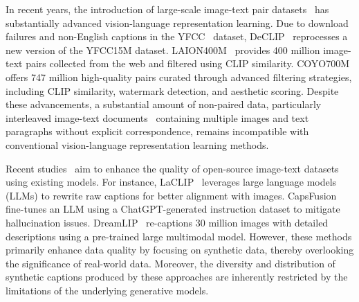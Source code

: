 In recent years, the introduction of large-scale image-text pair datasets~\cite{laion400M, laion5B, YFCC100M, kakaobrain2022coyo700m, Datacomp} has substantially advanced vision-language representation learning. Due to download failures and non-English captions in the YFCC~\cite{YFCC100M} dataset, DeCLIP~\cite{DECLIP} reprocesses a new version of the YFCC15M dataset. LAION400M~\cite{laion400M} provides 400 million image-text pairs collected from the web and filtered using CLIP similarity. COYO700M~\cite{kakaobrain2022coyo700m} offers 747 million high-quality pairs curated through advanced filtering strategies, including CLIP similarity, watermark detection, and aesthetic scoring. Despite these advancements, a substantial amount of non-paired data, particularly interleaved image-text documents~\cite{MMC4, Obelics, omnicorpus} containing multiple images and text paragraphs without explicit correspondence, remains incompatible with conventional vision-language representation learning methods.


Recent studies~\cite{laclip, yu2024capsfusion, DreamLIP, Veclip} aim to enhance the quality of open-source image-text datasets using existing models. For instance, LaCLIP~\cite{laclip} leverages large language models (LLMs) to rewrite raw captions for better alignment with images. CapsFusion~\cite{yu2024capsfusion} fine-tunes an LLM using a ChatGPT-generated instruction dataset to mitigate hallucination issues. DreamLIP~\cite{DreamLIP} re-captions 30 million images with detailed descriptions using a pre-trained large multimodal model. However, these methods primarily enhance data quality by focusing on synthetic data, thereby overlooking the significance of real-world data. Moreover, the diversity and distribution of synthetic captions produced by these approaches are inherently restricted by the limitations of the underlying generative models.


